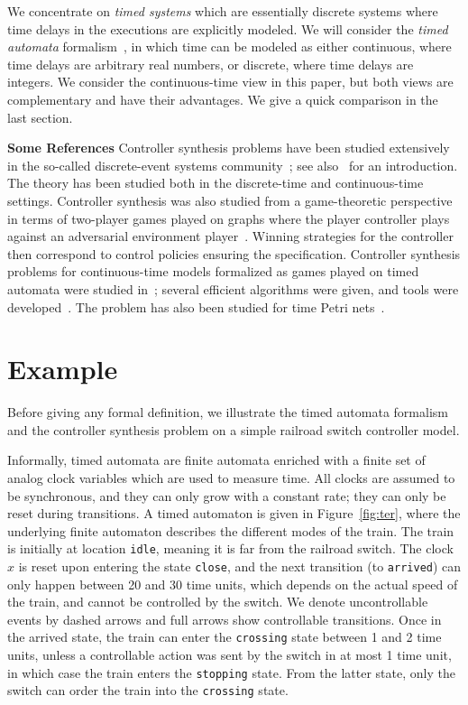\documentclass{article}
\begin{document}
We concentrate on \emph{timed systems} which are essentially discrete systems
where time delays in the executions are explicitly modeled. We will consider
the \emph{timed automata} formalism~\cite{AD-tcs94}, in which time can be
modeled as either continuous, where time delays are arbitrary real numbers, or
discrete, where time delays are integers. We consider the continuous-time view
in this paper, but both views are complementary and have 
their advantages. We give a quick comparison in the last section.

\textbf{Some References}
Controller synthesis problems have been studied extensively in the so-called
discrete-event systems community~\cite{rw-1989}; see also~\cite{CL-book06} for
an introduction. The theory has been studied both in the discrete-time and
continuous-time settings. Controller synthesis was also studied from a
game-theoretic perspective in terms of two-player games played on
graphs where the player controller plays against an adversarial environment
player~\cite{PR-popl89,ALW89,Dill89}.
Winning strategies for the controller then correspond to control
policies ensuring the specification. 
Controller synthesis problems for continuous-time models formalized as games
played on timed automata were 
studied in~\cite{AMP-concur98,AMPS98}; several efficient algorithms were
given, and tools were developed~\cite{TA-fm99,altisen2002tools,Cassez05}.
The problem has also been studied for time Petri nets~\cite{gardey2006safety}.

\section{Example}
Before giving any formal definition, we illustrate the timed automata formalism and the controller synthesis
problem on a simple railroad switch controller model.

Informally, timed automata are finite automata enriched with a finite set of analog clock
variables which are used to measure time. 
All clocks are assumed to be synchronous, and they can only grow with a constant rate; they can only be reset
during transitions. A timed automaton is given in Figure~\cref{fig:ter}, where
the underlying finite automaton describes the different modes of the train. 
The train is initially at location \texttt{idle}, meaning it is far from the
railroad switch. The clock~$x$
is reset upon entering the state \texttt{close}, and the next transition
(to \texttt{arrived}) can only happen between 20 and 30 time units, which
depends on the actual speed of the train, and cannot be controlled by the
switch. 
We denote uncontrollable events by dashed arrows and full arrows show
controllable transitions.
Once in the arrived state, the train can enter the \texttt{crossing} state
between 1 and 2 time units, unless a controllable action was sent by the switch
in at most 1 time unit, in which case the train enters the \texttt{stopping}
state. From the latter state, only the switch can order the train into the
\texttt{crossing} state.
\end{document}
